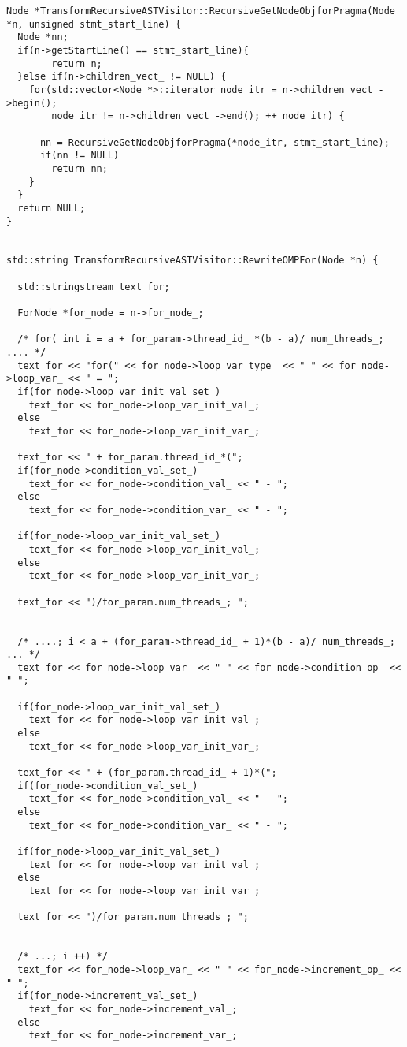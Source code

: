 \documentclass[a4paper,10pt,twoside]{book}
\begin{document}
\begin{lstlisting}[language=CCC, caption=driver/program.cpp]
Node *TransformRecursiveASTVisitor::RecursiveGetNodeObjforPragma(Node *n, unsigned stmt_start_line) {
  Node *nn;
  if(n->getStartLine() == stmt_start_line){
        return n;
  }else if(n->children_vect_ != NULL) {
    for(std::vector<Node *>::iterator node_itr = n->children_vect_->begin(); 
        node_itr != n->children_vect_->end(); ++ node_itr) {
      
      nn = RecursiveGetNodeObjforPragma(*node_itr, stmt_start_line);
      if(nn != NULL)
        return nn;
    }
  }
  return NULL;
}


std::string TransformRecursiveASTVisitor::RewriteOMPFor(Node *n) {

  std::stringstream text_for;

  ForNode *for_node = n->for_node_;

  /* for( int i = a + for_param->thread_id_ *(b - a)/ num_threads_; .... */
  text_for << "for(" << for_node->loop_var_type_ << " " << for_node->loop_var_ << " = ";
  if(for_node->loop_var_init_val_set_)
    text_for << for_node->loop_var_init_val_;
  else
    text_for << for_node->loop_var_init_var_;

  text_for << " + for_param.thread_id_*(";
  if(for_node->condition_val_set_)
    text_for << for_node->condition_val_ << " - ";
  else
    text_for << for_node->condition_var_ << " - ";

  if(for_node->loop_var_init_val_set_)
    text_for << for_node->loop_var_init_val_;
  else
    text_for << for_node->loop_var_init_var_;

  text_for << ")/for_param.num_threads_; "; 


  /* ....; i < a + (for_param->thread_id_ + 1)*(b - a)/ num_threads_; ... */
  text_for << for_node->loop_var_ << " " << for_node->condition_op_ << " ";

  if(for_node->loop_var_init_val_set_)
    text_for << for_node->loop_var_init_val_;
  else
    text_for << for_node->loop_var_init_var_;

  text_for << " + (for_param.thread_id_ + 1)*(";
  if(for_node->condition_val_set_)
    text_for << for_node->condition_val_ << " - ";
  else
    text_for << for_node->condition_var_ << " - ";

  if(for_node->loop_var_init_val_set_)
    text_for << for_node->loop_var_init_val_;
  else
    text_for << for_node->loop_var_init_var_;

  text_for << ")/for_param.num_threads_; "; 
  

  /* ...; i ++) */
  text_for << for_node->loop_var_ << " " << for_node->increment_op_ << " ";
  if(for_node->increment_val_set_)
    text_for << for_node->increment_val_;
  else
    text_for << for_node->increment_var_; 


\end{lstlisting}
\end{document}
